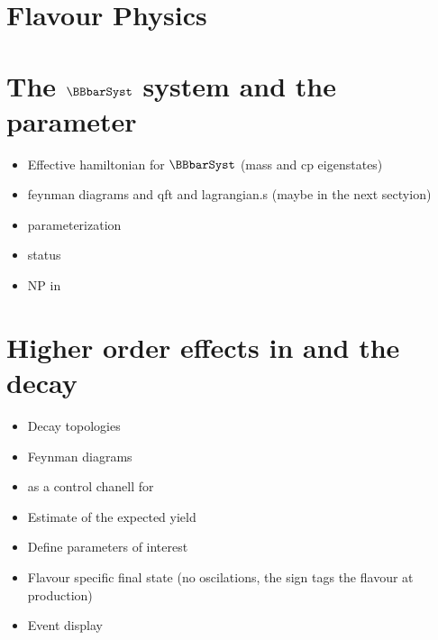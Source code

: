 \section{Flavour Physics}
\label{Flavour_Physics}



\section{The $\BBbarSyst$ system and the \phis parameter}
\label{Phenomenology}

\begin{itemize}
  \item Effective hamiltonian for $\BBbarSyst$ (mass and cp eigenstates)
  \item feynman diagrams and qft and lagrangian.s (maybe in the next sectyion)
  \item \phis parameterization
  \item \phis status
  \item NP in \phis
\end{itemize}

\section{Higher order effects in \phis and the \BsJpsiKst decay}
\label{TheBsJpsiKstDecay}

\begin{itemize}
\item Decay topologies
\item Feynman diagrams
\item \BsJpsiKst as a control chanell for \phis
\item Estimate of the expected yield
\item Define parameters of interest
\item Flavour specific final state (no oscilations, the sign tags the flavour at production)
\item Event display
\end{itemize}



